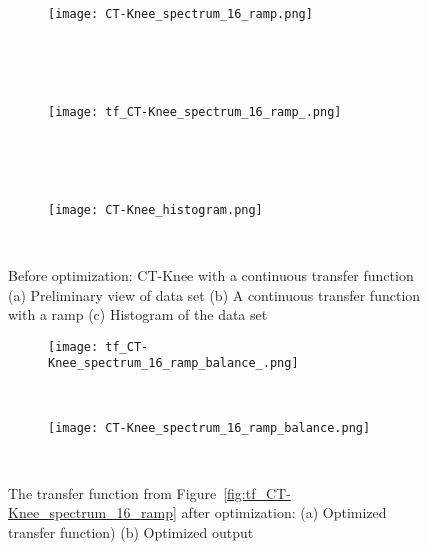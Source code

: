\begin{figure}
\centering

\begin{subfigure}{0.33\textwidth}
\texttt{[image: CT-Knee\_spectrum\_16\_ramp.png]}
\caption{~}
\end{subfigure}~
\begin{subfigure}{0.33\textwidth}
\texttt{[image: tf\_CT-Knee\_spectrum\_16\_ramp\_.png]}
\caption{~}
\label{fig:tf_CT-Knee_spectrum_16_ramp_}
\end{subfigure}~
\begin{subfigure}{0.33\textwidth}
\texttt{[image: CT-Knee\_histogram.png]}
\caption{~}
\label{fig:CT-Knee_histogram}
\end{subfigure}
\caption{Before optimization: CT-Knee with a continuous transfer 
function (a) Preliminary view of data set (b) A continuous transfer 
function with a ramp (c) Histogram of the data set}
\label{fig:tf_CT-Knee_spectrum_16_ramp}

\begin{subfigure}{0.33\textwidth}
\texttt{[image: tf\_CT-Knee\_spectrum\_16\_ramp\_balance\_.png]}
\caption{~}
\end{subfigure}
\begin{subfigure}{0.33\textwidth}
\texttt{[image: CT-Knee\_spectrum\_16\_ramp\_balance.png]}    
\caption{~}
\end{subfigure}
\caption{The transfer function from Figure~\ref{fig:tf_CT-Knee_spectrum_16_ramp} after optimization: (a) Optimized transfer function) (b) Optimized output}
\label{fig:tf_CT-Knee_spectrum_16_ramp_balance}

\end{figure}

